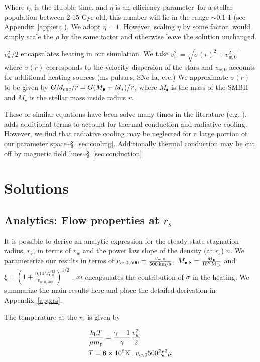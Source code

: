 \documentclass[usenatbib,fleqn]{mn2e}
\newcommand{\rs}{r_s}
\newcommand{\vw}{v_w}
\newcommand{\kew}{\frac{v_w^2}{2}}
\newcommand{\gammafi}{\frac{\gamma-1}{\gamma}}
\newcommand{\kb}{k_{\rm b}}
\renewcommand{\mp}{m_{\rm p}}
\newcommand{\Menc}{M_{\rm enc}}
\newcommand{\Mstar}{M_{\star}}
\newcommand{\Mbh}[1][]{M_{\bullet#1}}
\newcommand{\Mbheight}{M_{\bullet,8}}
\newcommand{\MbheightExp}{\frac{\Mbh}{10^8 \Msun}}
\newcommand{\vwO}{v_{w,0}}
\newcommand{\vwOFH}{v_{w,0,500}}
\newcommand{\vwOFHexp}{\frac{\vwO}{500 \, {\rm km/s}}}
\begin{document}
Where $t_h$ is the Hubble time, and $\eta$ is an efficiency parameter--for a stellar population between 2-15 Gyr old, this number will lie in the range $\sim$0.1-1 (see Appendix~\ref{app:eta}). We adopt $\eta=1$. However, scaling $\eta$ by some factor, would simply scale the $\rho$ by the same factor and otherwise leave the solution unchanged. 

$\vw^2/2$ encapsulates heating in our simulation. We take $\vw^2=\sqrt{\sigma(r)^2+v_{w,0}^2}$ where $\sigma(r)$ corresponds to the velocity dispersion of the stars and $v_{w,0}$ accounts for additional heating sources (ms pulsars, SNe Ia, etc.)  We approximate $\sigma(r)$ to be given by $G \Menc/r=G(\Mbh+\Mstar)/r$, where $\Mbh$ is the mass of the SMBH and $\Mstar$ is the stellar mass inside radius $r$. 

These or similar equations have been solve many times in the
literature (e.g. \citealt{HolzerAxford:1970a,Quataert:2004a,De-ColleGuillochon+:2012a,ShcherbakovWong+:2014a}). \citealt{ShcherbakovWong+:2014a}
adds additional terms to account for thermal conduction and radiative
cooling. However, we find that radiative cooling may be neglected for
a large portion of our parameter space--\S~\ref{sec:cooling}.
Additionally thermal conduction may be cut off by magnetic field
lines--\S~\ref{sec:conduction}


\section{Solutions}
\subsection{Analytics: Flow properties at $\rs$}
It is possible to derive an analytic expression for the steady-state
stagnation radius, $\rs$, in terms of $v_w$ and the power law slope of
the density (at $\rs$) $n$.  We parameterize our results in terms of
$\vwOFH=\vwOFHexp$, $\Mbheight=\MbheightExp$ and
$\xi=\left(1+\frac{0.14 \Mbheight^{0.43}}{\vwOFH}\right)^{1/2}$ . $xi$
encapsulates the contribution of $\sigma$ in the heating.  We
summarize the main results here and place the detailed derivation in
Appendix~\ref{app:rs}.


The temperature at the $\rs$ is given by

\begin{align}
  &\frac{\kb T}{\mu \mp}=\gammafi \kew \label{eq:tstag}\\
  &T=6 \times 10^6 {\rm K} \,  \,\ \vwO500^2 \xi^2 \mu
\end{align}
\end{document}
